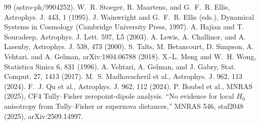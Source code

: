\documentclass[10pt]{article}
\theoremstyle{definition}
\begin{document}
\begin{thebibliography}{99}
(astro-ph/9904252).
 W.~R. Stoeger, R. Maartens, and
G.~F.~R. Ellis, Astrophys. J. 443, 1 (1995).
 J. Wainwright and G.~F.~R. Ellis (eds.),
Dynamical Systems in Cosmology (Cambridge University Press, 1997).
 A. Hajian and T. Souradeep,
Astrophys. J. Lett. 597, L5 (2003).
 A. Lewis, A. Challinor, and A. Lasenby,
Astrophys. J. 538, 473 (2000).
 S. Talts, M. Betancourt, D. Simpson, A. Vehtari,
and A. Gelman, arXiv:1804.06788 (2018).
 X.-L. Meng and W.~H. Wong,
Statistica Sinica 6, 831 (1996).
 A. Vehtari, A. Gelman, and J. Gabry,
Stat. Comput. 27, 1413 (2017).
 M.~S. Madhavacheril et al.,
Astrophys. J. 962, 113 (2024).
 F.~J. Qu et al., Astrophys. J. 962, 112 (2024).
 P. Boubel et al., MNRAS (2025),
CF4 Tully--Fisher zeropoint-dipole analysis.
 ``No evidence for local $H_0$ anisotropy
from Tully--Fisher or supernova distances,'' MNRAS 546, staf2048
(2025), arXiv:2509.14997.
\end{thebibliography}
\end{document}
